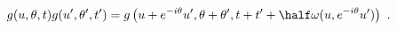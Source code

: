 \begin{equation}
  \label{eq:mult}
  g(u,\theta,t) g(u',\theta',t') = g\left(u + e^{-i\theta} u', \theta +
    \theta', t+ t' + \half \omega(u,e^{-i\theta}u')\right)~.
\end{equation}

